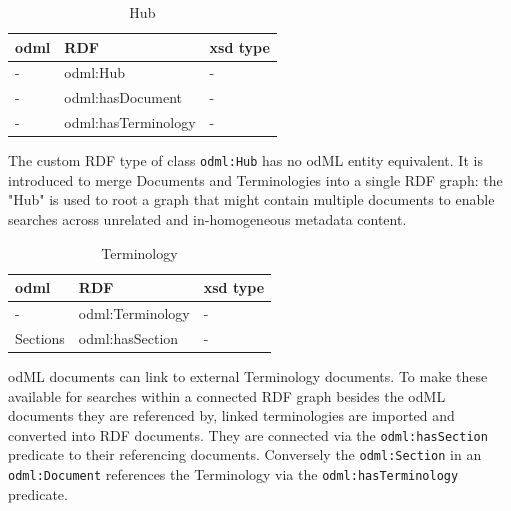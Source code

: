 \documentclass{article}
\begin{document}
\begin{table}
\begin{threeparttable}
\begin{tabular}{lll}
\toprule
    odml            & RDF                           & xsd type \\
\midrule
    -               & odml:Hub                      & - \\
    -               & odml:hasDocument              & - \\
    -               & odml:hasTerminology           & - \\
\bottomrule
\end{tabular}
\caption{Hub}
\begin{tablenotes}
\item The custom RDF type of class \texttt{odml:Hub} has no odML entity equivalent. It is introduced to merge Documents and Terminologies into a single RDF graph: the "Hub" is used to root a graph that might contain multiple documents to enable searches across unrelated and in-homogeneous metadata content.
\end{tablenotes}
\label{table:Hub}
\end{threeparttable}
\end{table}

\begin{table}
\begin{threeparttable}
\begin{tabular}{lll}
\toprule
    odml            & RDF                               & xsd type \\
\midrule
    -               & odml:Terminology                  & - \\
    Sections        & odml:hasSection                   & - \\
\bottomrule
\end{tabular}
\caption{Terminology}
\begin{tablenotes}
\item odML documents can link to external Terminology documents. To make these available for searches within a connected RDF graph besides the odML documents they are referenced by, linked terminologies are imported and converted into RDF documents. They are connected via the \texttt{odml:hasSection} predicate to their referencing documents. Conversely the \texttt{odml:Section} in an \texttt{odml:Document} references the Terminology via the \texttt{odml:hasTerminology} predicate.
\end{tablenotes}
\label{table:Terminology}
\end{threeparttable}
\end{table}
\end{document}
